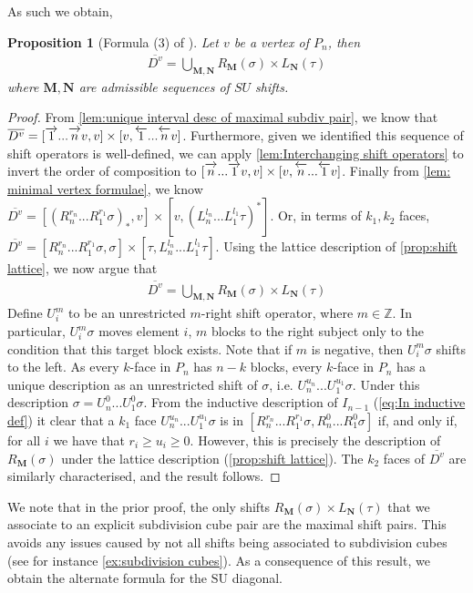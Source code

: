 \documentclass{amsart}
\newtheorem{proposition}[theorem]{Proposition}
\theoremstyle{definition}
\newcommand{\SU}{\mathrm{SU}}
\newcommand{\rightshift}[1]{\overrightarrow{\vphantom{1}{#1}}}
\newcommand{\leftshift}[1]{\overleftarrow{\vphantom{1}{#1}}}
\newcommand{\maxsubdivpairsv}{\overline{D^v}}
\begin{document}
As such we obtain,
\begin{proposition}[Formula (3) of \cite{saneblidzeComparingDiagonalsAssociahedra2022}]
Let $v$ be a vertex of $P_n$, then
\begin{align*}
    \maxsubdivpairsv = \bigcup_{\mathbf{M},\mathbf{N}} R_\mathbf{M}(\sigma) \times L_{\mathbf{N}}(\tau)
\end{align*}
where $\mathbf{M},\mathbf{N}$ are admissible sequences of $SU$ shifts.
\end{proposition}
\begin{proof}
From \cref{lem:unique interval desc of maximal subdiv pair}, we know that $\maxsubdivpairsv = [\rightshift{1}...\rightshift{n}v, v] \times [v, \leftshift{1}...\leftshift{n}v]$. Furthermore, given we identified this sequence of shift operators is well-defined, we can apply \cref{lem:Interchanging shift operators} to invert the order of composition to $[\rightshift{n}...\rightshift{1}v, v] \times [v, \leftshift{n}...\leftshift{1}v]$.
Finally from \cref{lem: minimal vertex formulae}, we know $\maxsubdivpairsv =[(R^{r_n}_{n}...R^{r_{1}}_{1}\sigma)_*,v] \times [v,(L^{l_n}_{n}...L^{l_{1}}_{1}\tau)^*]$.
Or, in terms of $k_1,k_2$ faces,
$\maxsubdivpairsv = [R^{r_n}_{n}...R^{r_{1}}_{1}\sigma,\sigma] \times [\tau, L^{l_n}_{n}...L^{l_{1}}_{1}\tau]$.
Using the lattice description of \cref{prop:shift lattice}, we now argue that 
\begin{align*}
    \maxsubdivpairsv = \bigcup_{\mathbf{M},\mathbf{N}} R_\mathbf{M}(\sigma) \times L_{\mathbf{N}}(\tau)
\end{align*}
Define $U^{m}_i$ to be an unrestricted $m$-right shift operator, where $m \in \mathbb{Z}$.
In particular, $U^{m}_i \sigma$ moves element $i$, $m$ blocks to the right subject only to the condition that this target block exists.
Note that if $m$ is negative, then $U^{m}_i \sigma$ shifts to the left.
As every $k$-face in $P_n$ has $n-k$ blocks, every $k$-face in $P_n$ has a unique description as an unrestricted shift of $\sigma$, i.e. $U^{u_n}_{n}...U^{u_{1}}_{1}\sigma$.
Under this description $\sigma = {U}^{0}_{n}...{U}^{0}_{1}\sigma$.
From the inductive description of $I_{n-1}$ (\cref{eq:In inductive def}) it clear that a $k_1$ face $U^{u_n}_{n}...U^{u_{1}}_{1}\sigma$ is in $[R^{r_n}_{n}...R^{r_{1}}_{1}\sigma,R^{0}_{n}...R^{0}_{1}\sigma]$ if, and only if, for all $i$ we have that $r_{i}\geq u_i \geq 0$.
However, this is precisely the description of $R_\mathbf{M}(\sigma)$ under the lattice description (\cref{prop:shift lattice}).
The $k_2$ faces of $\maxsubdivpairsv$ are similarly characterised, and the result follows.
\end{proof}
We note that in the prior proof, the only shifts $R_\mathbf{M}(\sigma) \times L_{\mathbf{N}}(\tau)$ that we associate to an explicit subdivision cube pair are the maximal shift pairs.
This avoids any issues caused by not all shifts being associated to subdivision cubes (see for instance \cref{ex:subdivision cubes}).
As a consequence of this result, we obtain the alternate formula for the $\SU$ diagonal.
\end{document}

